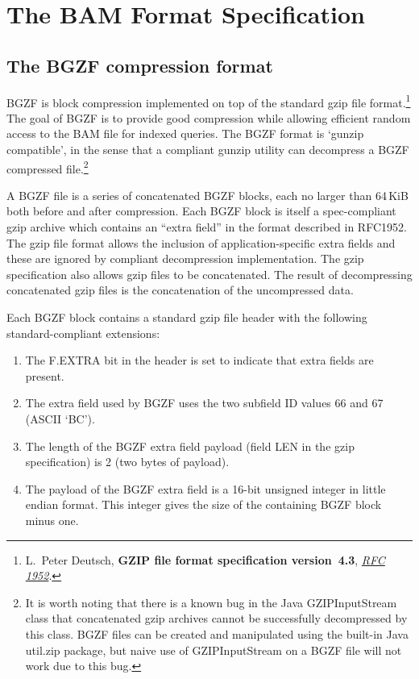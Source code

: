 \documentclass[10pt]{article}
\begin{document}
\pagebreak

\section{The BAM Format Specification}

\subsection{The BGZF compression format}

BGZF is block compression implemented on top of the standard gzip file
format.\footnote{L.~Peter Deutsch, {\bf GZIP file format specification
version~4.3}, \href{http://tools.ietf.org/html/rfc1952}{\sl RFC 1952}.}
The goal of BGZF is to provide good compression while allowing
efficient random access to the BAM file for indexed queries. The BGZF
format is `gunzip compatible', in the sense that a compliant gunzip
utility can decompress a BGZF compressed file.\footnote{It is worth noting that there is a known bug in the Java {\sf
  GZIPInputStream} class that concatenated gzip archives cannot be
successfully decompressed by this class. BGZF files can be created and
manipulated using the built-in Java {\sf util.zip} package, but naive
use of {\sf GZIPInputStream} on a BGZF file will not work due to this
bug.}

A BGZF file is a series of concatenated BGZF blocks, each no larger
than 64\,KiB both before and after compression. Each BGZF block
is itself a spec-compliant gzip archive which contains an ``extra field''
in the format described in RFC1952. The gzip file format allows the
inclusion of application-specific extra fields and these are ignored by
compliant decompression implementation. The gzip specification also
allows gzip files to be concatenated. The result of decompressing
concatenated gzip files is the concatenation of the uncompressed data.

Each BGZF block contains a standard gzip file header with the following
standard-compliant extensions:

\begin{enumerate}
\item The {\sf F.EXTRA} bit in the header is set to indicate that extra
  fields are present.
\item The extra field used by BGZF uses the two subfield ID values 66 and 67 (ASCII `BC').
\item The length of the BGZF extra field payload (field {\sf LEN} in the
  gzip specification) is 2 (two bytes of payload).
\item The payload of the BGZF extra field is a 16-bit unsigned integer
  in little endian format. This integer gives the size of the containing
  BGZF block minus one.
\end{enumerate}
\end{document}
